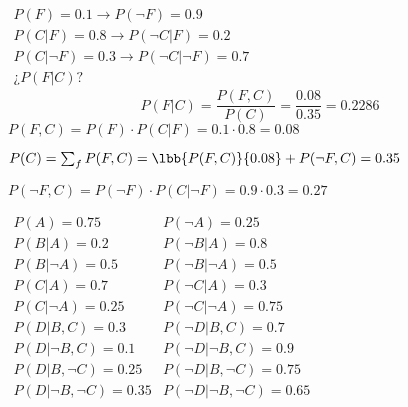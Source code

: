 $\begin{array}{l}
    P(F)=0.1\to P(\neg F)=0.9\\
    P(C|F)=0.8\to P(\neg C|F)=0.2\\
    P(C|\neg F)=0.3\to P(\neg C|\neg F)=0.7\\
    \text{¿}P(F|C)?
\end{array}$
\[
P(F|C)=\dfrac{P(F,C)}{P(C)}=\dfrac{0.08}{0.35}=0.2286
\] 
$P(F,C)=P(F)\cdot P(C|F)=0.1\cdot 0.8=0.08$

$P(C)=\sum_{f} P(F,C)=\lbb{P(F,C)}{0.08} +P(\neg F,C)=0.35 $ 

$P(\neg F,C)=P(\neg F)\cdot P(C|\neg F)=0.9\cdot 0.3=0.27$

\vspace{1em}
\hline

\begin{center}
\end{center}
$\begin{array}{ll}
    P(A)=0.75 & P(\neg A)=0.25\\
    P(B|A)=0.2 & P(\neg B|A)=0.8\\
    P(B|\neg A)=0.5 & P(\neg B|\neg A)=0.5\\
    P(C|A)=0.7 & P(\neg C|A)=0.3\\
    P(C|\neg A)=0.25 & P(\neg C|\neg A)=0.75\\
    P(D|B,C)=0.3 & P(\neg D|B,C)=0.7\\
    P(D|\neg B, C)=0.1 & P(\neg D|\neg B,C)=0.9\\
    P(D|B,\neg C)=0.25 & P(\neg D|B,\neg C)=0.75\\
    P(D|\neg B, \neg C)=0.35 & P(\neg D|\neg B,\neg C)=0.65
\end{array}$

